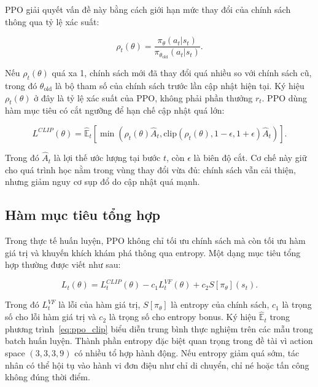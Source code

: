 PPO giải quyết vấn đề này bằng cách giới hạn mức thay đổi của chính sách thông qua tỷ lệ xác suất:

\begin{equation}
    \rho_t(\theta) =
    \frac{\pi_\theta(a_t|s_t)}
    {\pi_{\theta_{\mathrm{old}}}(a_t|s_t)}.
\end{equation}

Nếu $\rho_t(\theta)$ quá xa 1, chính sách mới đã thay đổi quá nhiều so với chính sách cũ, trong đó $\theta_{\mathrm{old}}$ là bộ tham số của chính sách trước lần cập nhật hiện tại. Ký hiệu $\rho_t(\theta)$ ở đây là tỷ lệ xác suất của PPO, không phải phần thưởng $r_t$. PPO dùng hàm mục tiêu có cắt ngưỡng để hạn chế cập nhật quá lớn:

\begin{equation} \label{eq:ppo_clip}
    L^{CLIP}(\theta) =
    \hat{\mathbb{E}}_t
    \left[
    \min
    \left(
    \rho_t(\theta)\hat{A}_t,
    \mathrm{clip}(\rho_t(\theta),1-\epsilon,1+\epsilon)\hat{A}_t
    \right)
    \right].
\end{equation}

Trong đó $\hat{A}_t$ là lợi thế ước lượng tại bước $t$, còn $\epsilon$ là biên độ cắt. Cơ chế này giữ cho quá trình học nằm trong vùng thay đổi vừa đủ: chính sách vẫn cải thiện, nhưng giảm nguy cơ sụp đổ do cập nhật quá mạnh.

\subsection{Hàm mục tiêu tổng hợp}

Trong thực tế huấn luyện, PPO không chỉ tối ưu chính sách mà còn tối ưu hàm giá trị và khuyến khích khám phá thông qua entropy. Một dạng mục tiêu tổng hợp thường được viết như sau:

\begin{equation} \label{eq:ppo_total}
    L_t(\theta) =
    L_t^{CLIP}(\theta)
    - c_1 L_t^{VF}(\theta)
    + c_2 S[\pi_\theta](s_t).
\end{equation}

Trong đó $L_t^{VF}$ là lỗi của hàm giá trị, $S[\pi_\theta]$ là entropy của chính sách, $c_1$ là trọng số cho lỗi hàm giá trị và $c_2$ là trọng số cho entropy bonus. Ký hiệu $\hat{\mathbb{E}}_t$ trong phương trình~\ref{eq:ppo_clip} biểu diễn trung bình thực nghiệm trên các mẫu trong batch huấn luyện. Thành phần entropy đặc biệt quan trọng trong đề tài vì action space $(3,3,3,9)$ có nhiều tổ hợp hành động. Nếu entropy giảm quá sớm, tác nhân có thể hội tụ vào hành vi đơn điệu như chỉ di chuyển, chỉ né hoặc tấn công không đúng thời điểm.

